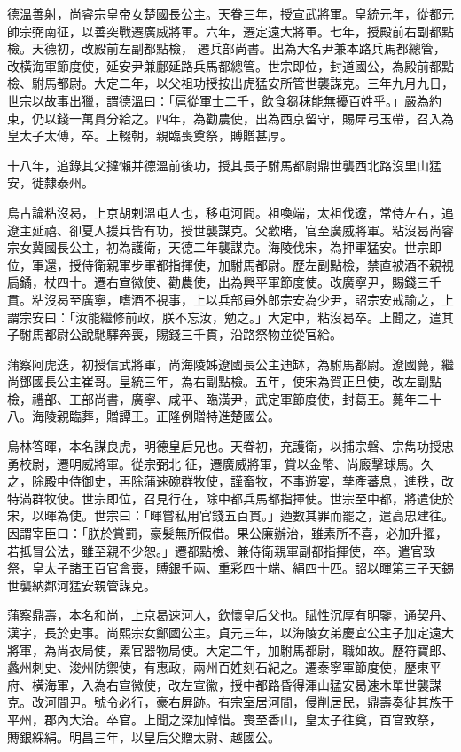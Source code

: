 \begin{pinyinscope}
 德溫善射，尚睿宗皇帝女楚國長公主。天眷三年，授宣武將軍。皇統元年，從都元帥宗弼南征，以善突戰遷廣威將軍。六年，遷定遠大將軍。七年，授殿前右副都點檢。天德初，改殿前左副都點檢，
 遷兵部尚書。出為大名尹兼本路兵馬都總管，改橫海軍節度使，延安尹兼鄜延路兵馬都總管。世宗即位，封道國公，為殿前都點檢、駙馬都尉。大定二年，以父祖功授按出虎猛安所管世襲謀克。三年九月九日，世宗以故事出獵，謂德溫曰：「扈從軍士二千，飲食芻秣能無擾百姓乎。」嚴為約束，仍以錢一萬貫分給之。四年，為勸農使，出為西京留守，賜犀弓玉帶，召入為皇太子太傅，卒。上輟朝，親臨喪奠祭，賻贈甚厚。



 十八年，追錄其父撻懶并德溫前後功，授其長子駙馬都尉鼎世襲西北路沒里山猛安，徙隸泰州。



 烏古論粘沒曷，上京胡剌溫屯人也，移屯河間。祖喚端，太祖伐遼，常侍左右，追遼主延禧、卻夏人援兵皆有功，授世襲謀克。父歡睹，官至廣威將軍。粘沒曷尚睿宗女冀國長公主，初為護衛，天德二年襲謀克。海陵伐宋，為押軍猛安。世宗即位，軍還，授侍衛親軍步軍都指揮使，加駙馬都尉。歷左副點檢，禁直被酒不親視扃鐍，杖四十。遷右宣徽使、勸農使，出為興平軍節度使。改廣寧尹，賜錢三千貫。粘沒曷至廣寧，嗜酒不視事，上以兵部員外郎宗安為少尹，詔宗安戒諭之，上謂宗安曰：「汝能繼修前政，朕不忘汝，勉之。」大定中，粘沒曷卒。上聞之，遣其
 子駙馬都尉公說馳驛奔喪，賜錢三千貫，沿路祭物並從官給。



 蒲察阿虎迭，初授信武將軍，尚海陵姊遼國長公主迪缽，為駙馬都尉。遼國薨，繼尚鄧國長公主崔哥。皇統三年，為右副點檢。五年，使宋為賀正旦使，改左副點檢，禮部、工部尚書，廣寧、咸平、臨潢尹，武定軍節度使，封葛王。薨年二十八。海陵親臨葬，贈譚王。正隆例贈特進楚國公。



 烏林答暉，本名謀良虎，明德皇后兄也。天眷初，充護衛，以捕宗磐、宗雋功授忠勇校尉，遷明威將軍。從宗弼北
 征，遷廣威將軍，賞以金幣、尚廄擊球馬。久之，除殿中侍御史，再除蒲速碗群牧使，謹畜牧，不事遊宴，孳產蕃息，進秩，改特滿群牧使。世宗即位，召見行在，除中都兵馬都指揮使。世宗至中都，將遣使於宋，以暉為使。世宗曰：「暉嘗私用官錢五百貫。」迺數其罪而罷之，遣高忠建往。因謂宰臣曰：「朕於賞罰，豪髮無所假借。果公廉辦治，雖素所不喜，必加升擢，若抵冒公法，雖至親不少恕。」遷都點檢、兼侍衛親軍副都指揮使，卒。遣官致祭，皇太子諸王百官會喪，賻銀千兩、重彩四十端、絹四十匹。詔以暉第三子天錫世襲納鄰河猛安親管謀克。



 蒲察鼎壽，本名和尚，上京曷速河人，欽懷皇后父也。賦性沉厚有明鑒，通契丹、漢字，長於吏事。尚熙宗女鄭國公主。貞元三年，以海陵女弟慶宜公主子加定遠大將軍，為尚衣局使，累官器物局使。大定二年，加駙馬都尉，職如故。歷符寶郎、蠡州刺史、浚州防禦使，有惠政，兩州百姓刻石紀之。遷泰寧軍節度使，歷東平府、橫海軍，入為右宣徽使，改左宣徽，授中都路昏得渾山猛安曷速木單世襲謀克。改河間尹。號令必行，豪右屏跡。有宗室居河間，侵削居民，鼎壽奏徙其族于平州，郡內大治。卒官。上聞之深加悼惜。喪至香山，皇太子往奠，百官致祭，
 賻銀綵絹。明昌三年，以皇后父贈太尉、越國公。




\end{pinyinscope}
